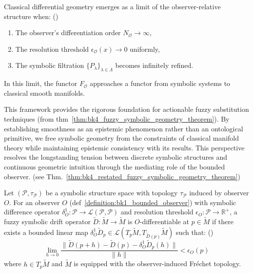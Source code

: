 \begin{corollary} \label{corollary:bk4_emergence_of_classical_ge}
Classical differential geometry emerges as a limit of the observer-relative structure when: ()
\begin{enumerate}
    \item The observer's differentiation order $N_\mathcal{O} \to \infty$,
    \item The resolution threshold $\epsilon_\mathcal{O}(x) \to 0$ uniformly,
    \item The symbolic filtration $\{P_\lambda\}_{\lambda \in \Lambda}$ becomes infinitely refined.
\end{enumerate}
In this limit, the functor $F_\mathcal{O}$ approaches a functor from symbolic systems to classical smooth manifolds.
\end{corollary}
\begin{remark}
\label{remark:bk4_fuzzy_notation}
This framework provides the rigorous foundation for actionable fuzzy substitution techniques (from thm~\ref{thm:bk4_fuzzy_symbolic_geometry_theorem}). By establishing smoothness as an epistemic phenomenon rather than an ontological primitive, we free symbolic geometry from the constraints of classical manifold theory while maintaining epistemic consistency with its results. This perspective resolves the longstanding tension between discrete symbolic structures and continuous geometric intuition through the mediating role of the bounded observer. (see Thm.~\ref{thm:bk4_restated_fuzzy_symbolic_geometry_theorem})
\end{remark}
\begin{definition} \label{definition:bk4_observer_valid_different}

Let $(\mathcal{P}, \tau_{\mathcal{P}})$ be a symbolic structure space with topology $\tau_{\mathcal{P}}$ induced by observer $O$.
For an observer $O$ (def~\ref{definition:bk1_bounded_observer}) with symbolic difference operator $\delta^1_O: \mathcal{P} \to \mathcal{L}(\mathcal{P}, \mathcal{P})$ and resolution threshold $\epsilon_O: \mathcal{P} \to \mathbb{R}^+$, a fuzzy symbolic drift operator $\widetilde{D}: \widetilde{M} \to \widetilde{M}$ is $O$-differentiable at $p \in \widetilde{M}$ if there exists a bounded linear map $\delta^1_O \widetilde{D}_p \in \mathcal{L}(T_p\widetilde{M}, T_{\widetilde{D}(p)}\widetilde{M})$ such that: ()
\[
\lim_{h \to 0} \frac{\|\widetilde{D}(p+h) - \widetilde{D}(p) - \delta^1_O \widetilde{D}_p(h)\|}{\|h\|} < \epsilon_O(p)
\]
where $h \in T_p\widetilde{M}$ and $\widetilde{M}$ is equipped with the observer-induced Fréchet topology.
\end{definition}
